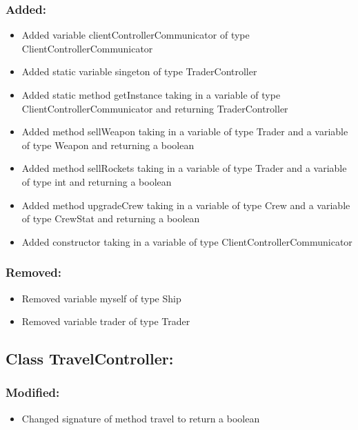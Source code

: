 \documentclass{article}
\begin{document}
\subsubsection{Added:}
\begin{itemize}
\item Added variable clientControllerCommunicator of type ClientControllerCommunicator
\item Added static variable singeton of type TraderController
\item Added static method getInstance taking in a variable of type ClientControllerCommunicator and returning TraderController
\item Added method sellWeapon taking in a variable of type Trader and a variable of type Weapon and returning a boolean
\item Added method sellRockets taking in a variable of type Trader and a variable of type int and returning a boolean
\item Added method upgradeCrew taking in a variable of type Crew and a variable of type CrewStat and returning a boolean
\item Added constructor taking in a variable of type ClientControllerCommunicator
\end{itemize}

\subsubsection{Removed:}
\begin{itemize}
\item Removed variable myself of type Ship
\item Removed variable trader of type Trader
\end{itemize}


\subsection{Class TravelController:}

\subsubsection{Modified:}
\begin{itemize}
\item Changed signature of method travel to return a boolean
\end{itemize}
\end{document}
